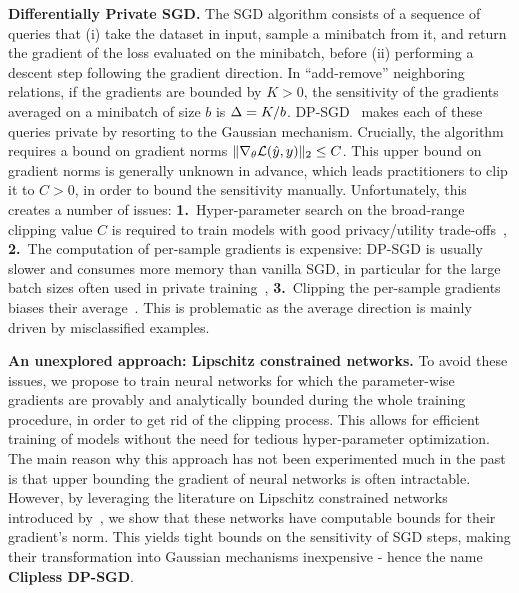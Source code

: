     
\textbf{Differentially Private SGD.} The SGD algorithm consists of a sequence of queries that (i) take the dataset in input, sample a minibatch from it, and return the gradient of the loss evaluated on the minibatch, before (ii) performing a descent step following the gradient direction. In ``add-remove'' neighboring relations, if the gradients are bounded by $K>0$, the sensitivity of the gradients averaged on a minibatch of size $b$ is $\Delta=K/b$. DP-SGD~\citep{abadi2016deep} makes each of these queries private by resorting to the Gaussian mechanism. Crucially, the algorithm requires a bound on gradient norms $\|\nabla_{\theta}\mathcal{L}(\hat y,y)\|_2\leq C$. This upper bound on gradient norms is generally unknown in advance, which leads practitioners to clip it to $C>0$, in order to bound the sensitivity manually. Unfortunately, this creates a number of issues: \textbf{1.}~Hyper-parameter search on the broad-range clipping value $C$ is required to train models with good privacy/utility trade-offs~\citep{papernot2022hyperparameter}, \textbf{2.}~The computation of per-sample gradients is expensive: DP-SGD is usually slower and consumes more memory than vanilla SGD, in particular
    for the large batch sizes often used in private training~\citep{lee2021scaling}, \textbf{3.}~Clipping the per-sample gradients biases their average~\citep{chen2020understanding}. This is problematic as the average direction is mainly driven by misclassified examples. %

\textbf{An unexplored approach: Lipschitz constrained networks.}
    To avoid these issues, we propose to train neural networks for which the parameter-wise gradients are provably and analytically bounded during the whole training procedure, in order to get rid of the clipping process. This allows for efficient training of models without the need for tedious hyper-parameter optimization. The main reason why this approach has not been experimented much in the past is that upper bounding the gradient of neural networks is often intractable. However, by leveraging the literature on Lipschitz constrained networks introduced by~\cite{anil2019sorting}, we show that these networks have computable bounds for their gradient's norm. This yields tight bounds on the sensitivity of SGD steps, making their transformation into Gaussian mechanisms inexpensive - hence the name \textbf{Clipless DP-SGD}. 

